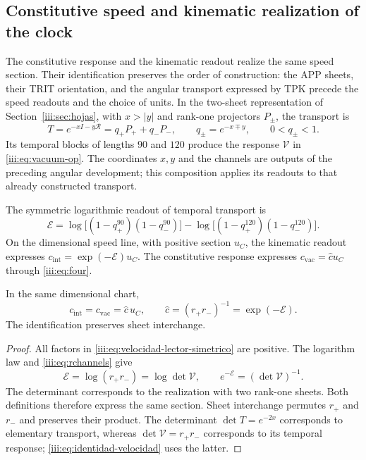\subsection{Constitutive speed and kinematic realization of the clock}
\label{iii:sec:enlace-velocidad-constitutiva}

The constitutive response and the kinematic readout realize the same
speed section. Their identification preserves the order of construction:
the APP sheets, their TRIT orientation, and the angular transport expressed
by TPK precede the speed readouts and the choice of units.
In the two-sheet representation of
Section~\ref{iii:sec:hojas}, with $x>|y|$ and rank-one projectors
$P_\pm$, the transport is
\[
 T=e^{-xI-y\mathcal R}=q_+P_++q_-P_-,
 \qquad q_\pm=e^{-x\mp y},\qquad 0<q_\pm<1.
\]
Its temporal blocks of lengths $90$ and $120$ produce the response
$\mathcal V$ in \eqref{iii:eq:vacuum-op}. The coordinates $x,y$ and the
channels are outputs of the preceding angular development; this composition
applies its readouts to that already constructed transport.

The symmetric logarithmic readout of temporal transport is
\begin{equation}
 \mathcal E=
 \log\!\bigl[(1-q_+^{90})(1-q_-^{90})\bigr]
 -\log\!\bigl[(1-q_+^{120})(1-q_-^{120})\bigr].
 \label{iii:eq:velocidad-lector-simetrico}
\end{equation}
On the dimensional speed line, with positive section $u_C$, the
kinematic readout expresses $c_{\mathrm{int}}=\exp(-\mathcal E)u_C$.
The constitutive response expresses
$c_{\mathrm{vac}}=\widehat c u_C$ through \eqref{iii:eq:four}.

\begin{proposition}
\label{iii:prop:identidad-velocidad}
In the same dimensional chart,
\begin{equation}
 c_{\mathrm{int}}=c_{\mathrm{vac}}=\widehat c\,u_C,
 \qquad \widehat c=(r_+r_-)^{-1}=\exp(-\mathcal E).
 \label{iii:eq:identidad-velocidad}
\end{equation}
The identification preserves sheet interchange.
\end{proposition}
\begin{proof}
All factors in \eqref{iii:eq:velocidad-lector-simetrico} are
positive. The logarithm law and \eqref{iii:eq:rchannels} give
\[
 \mathcal E=\log(r_+r_-)=\log\det\mathcal V,
 \qquad e^{-\mathcal E}=(\det\mathcal V)^{-1}.
\]
The determinant corresponds to the realization with two rank-one sheets.
Both definitions therefore express the same section. Sheet interchange
permutes $r_+$ and $r_-$ and preserves their product. The determinant
$\det T=e^{-2x}$ corresponds to elementary transport, whereas
$\det\mathcal V=r_+r_-$ corresponds to its temporal response;
\eqref{iii:eq:identidad-velocidad} uses the latter.
\end{proof}

